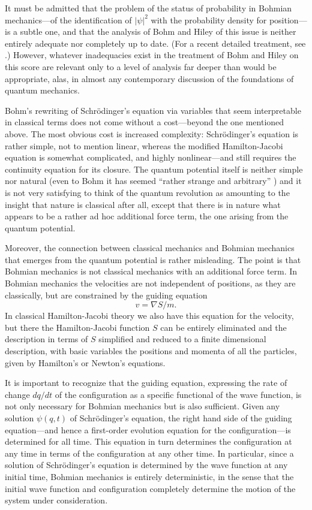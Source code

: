 It must be admitted that the problem of the status of probability in
Bohmian mechanics---of the identification of ${|\psi|}^2$ with the
probability density for position---is a subtle one, and that the analysis
of Bohm and Hiley of this issue is neither entirely adequate nor completely
up to date. (For a recent detailed treatment, see \cite{DGZ}.) However,
whatever inadequacies exist in the treatment of Bohm and Hiley on this
score are relevant only to a level of analysis far deeper than would be
appropriate, alas, in almost any contemporary discussion of the foundations
of quantum mechanics.

Bohm's rewriting of Schr\"odinger's equation via variables that seem
interpretable in classical terms does not come without a cost---beyond the
one mentioned above. The most obvious cost is increased complexity:
Schr\"odinger's equation is rather simple, not to mention linear, whereas
the modified Hamilton-Jacobi equation is somewhat complicated, and highly
nonlinear---and still requires the continuity equation for its closure. The
quantum potential itself is neither simple nor natural (even to Bohm it has
seemed ``rather strange and arbitrary'' \cite{bohm}) and it is not very
satisfying to think of the quantum revolution as amounting to the insight
that nature is classical after all, except that there is in nature what
appears to be a rather ad hoc additional force term, the one arising from
the quantum potential.

Moreover, the connection between classical mechanics and Bohmian mechanics
that emerges from the quantum potential is rather misleading. The point is
that Bohmian mechanics is not classical mechanics with an additional force
term. In Bohmian mechanics the velocities are not independent of positions,
as they are classically, but are constrained by the guiding equation $$
v=\nabla S/m.  $$ In classical Hamilton-Jacobi theory we also have this
equation for the velocity, but there the Hamilton-Jacobi function $S$ can
be entirely eliminated and the description in terms of $S$ simplified and
reduced to a finite dimensional description, with basic variables the
positions and momenta of all the particles, given by Hamilton's or
Newton's equations.

It is important to recognize that the guiding equation, expressing the rate
of change $dq/dt$ of the configuration as a specific functional of the wave
function, is not only necessary for Bohmian mechanics but is also
sufficient.  Given any solution $\psi(q,t)$ of Schr\"odinger's equation,
the right hand side of the guiding equation---and hence a first-order
evolution equation for the configuration---is determined for all time. This
equation in turn determines the configuration at any time in terms of the
configuration at any other time.  In particular, since a solution of
Schr\"odinger's equation is determined by the wave function at any initial
time, Bohmian mechanics is entirely deterministic, in the sense that the
initial wave function and configuration completely determine the motion of
the system under consideration.

